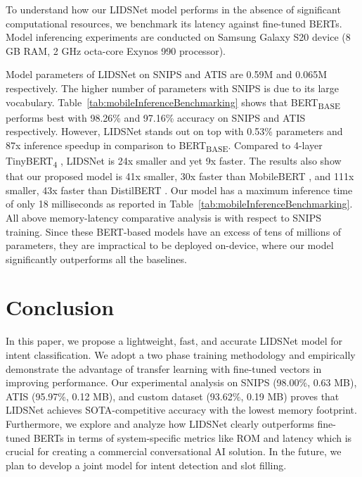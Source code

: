 \documentclass[conference]{IEEEtran}
\begin{document}
To understand how our LIDSNet model performs in the absence of significant computational resources, we benchmark its latency against fine-tuned BERTs. Model inferencing experiments are conducted on Samsung Galaxy S20 device (8 GB RAM, 2 GHz octa-core Exynos 990 processor).

Model parameters of LIDSNet on SNIPS and ATIS are 0.59M and 0.065M respectively. The higher number of parameters with SNIPS is due to its large vocabulary. Table~\ref{tab:mobileInferenceBenchmarking} shows that BERT\textsubscript{BASE} \cite{devlin2019bert} performs best with 98.26\% and 97.16\% accuracy on SNIPS and ATIS respectively. However, LIDSNet stands out on top with 0.53\% parameters and 87x inference speedup in comparison to BERT\textsubscript{BASE}. Compared to 4-layer TinyBERT\textsubscript{4} \cite{jiao-etal-2020-tinybert}, LIDSNet is 24x smaller and yet 9x faster. The results also show that our proposed model is 41x smaller, 30x faster than MobileBERT \cite{sun-etal-2020-mobilebert}, and 111x smaller, 43x faster than DistilBERT \cite{sanh2020distilbert}. Our model has a maximum inference time of only 18 milliseconds as reported in Table~\ref{tab:mobileInferenceBenchmarking}. All above memory-latency comparative analysis is with respect to SNIPS training. Since these BERT-based models have an excess of tens of millions of parameters, they are impractical to be deployed on-device, where our model significantly outperforms all the baselines.


\section{Conclusion}\label{sec:conclusion}

In this paper, we propose a lightweight, fast, and accurate LIDSNet model for intent classification. We adopt a two phase training methodology and empirically demonstrate the advantage of transfer learning with fine-tuned vectors in improving performance. Our experimental analysis on SNIPS (98.00\%, 0.63 MB), ATIS (95.97\%, 0.12 MB), and custom dataset (93.62\%, 0.19 MB) proves that LIDSNet achieves SOTA-competitive accuracy with the lowest memory footprint. Furthermore, we explore and analyze how LIDSNet clearly outperforms fine-tuned BERTs in terms of system-specific metrics like ROM and latency which is crucial for creating a commercial conversational AI solution. In the future, we plan to develop a joint model for intent detection and slot filling.




\end{document}
